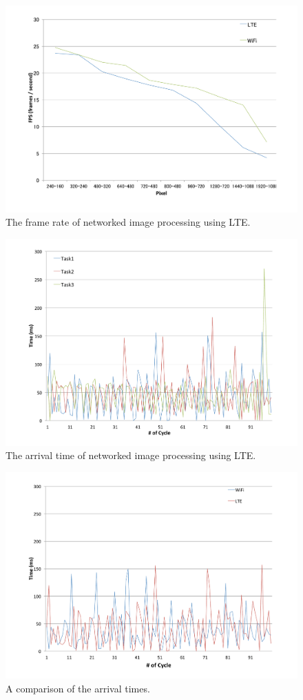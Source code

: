 \begin{figure}[!t]
 \centering
 \includegraphics[width=0.8\hsize]{fig/No10_TIPiC_FPS_graph_LTE.pdf}
 \caption{The frame rate of networked image processing using LTE.}
 \label{fig:no10}
\end{figure}

\begin{figure}[!t]
 \centering
 \includegraphics[width=0.8\hsize]{fig/No11_TIPiC_serv_cycle_LTE.pdf}
 \caption{The arrival time of networked image processing using LTE.}
 \label{fig:no11}
\end{figure}

\begin{figure}[!t]
 \centering
 \includegraphics[width=0.8\hsize]{fig/No12_TIPiC_serv_cycle_compare_WiFi_and_LTE.pdf}
 \caption{A comparison of the arrival times.}
 \label{fig:no12}
\end{figure}

